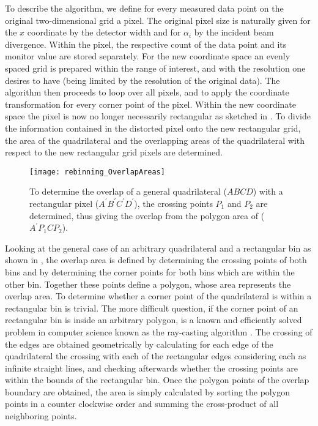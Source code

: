 \documentclass[\main/dresen_thesis.tex]{subfiles}
\begin{document}
  To describe the algorithm, we define for every measured data point on the original two-dimensional grid a pixel.
  The original pixel size is naturally given for the $x$ coordinate by the detector width and for $\alpha_i$ by the incident beam divergence.
  Within the pixel, the respective count of the data point and its monitor value are stored separately.
  For the new coordinate space an evenly spaced grid is prepared within the range of interest, and with the resolution one desires to have (being limited by the resolution of the original data).
  The algorithm then proceeds to loop over all pixels, and to apply the coordinate transformation for every corner point of the pixel.
  Within the new coordinate space the pixel is now no longer necessarily rectangular as sketched in .
  To divide the information contained in the distorted pixel onto the new rectangular grid, the area of the quadrilateral and the overlapping areas of the quadrilateral with respect to the new rectangular grid pixels are determined.

  \begin{figure}[tb]
    \centering
    \texttt{[image: rebinning\_OverlapAreas]}
    \caption{\label{fig:numericalMethods:rebinningPixelSplitting:overlapAreas}To determine the overlap of a general quadrilateral ($ABCD$) with a rectangular pixel ($A^\prime B^\prime C^\prime D^\prime $), the crossing points $P_1$ and $P_2$ are determined, thus giving the overlap from the polygon area of ($A^\prime P_1CP_2$).}
  \end{figure}

  Looking at the general case of an arbitrary quadrilateral and a rectangular bin as shown in , the overlap area is defined by determining the crossing points of both bins and by determining the corner points for both bins which are within the other bin.
  Together these points define a polygon, whose area represents the overlap area.
  To determine whether a corner point of the quadrilateral is within a rectangular bin is trivial.
  The more difficult question, if the corner point of an rectangular bin is inside an arbitrary polygon, is a known and efficiently solved problem in computer science known as the ray-casting algorithm \cite{Shimrat_1962_Algor}.
  The crossing of the edges are obtained geometrically by calculating for each edge of the quadrilateral the crossing with each of the rectangular edges considering each as infinite straight lines, and checking afterwards whether the crossing points are within the bounds of the rectangular bin.
  Once the polygon points of the overlap boundary are obtained, the area is simply calculated by sorting the polygon points in a counter clockwise order and summing the cross-product of all neighboring points.
\end{document}
